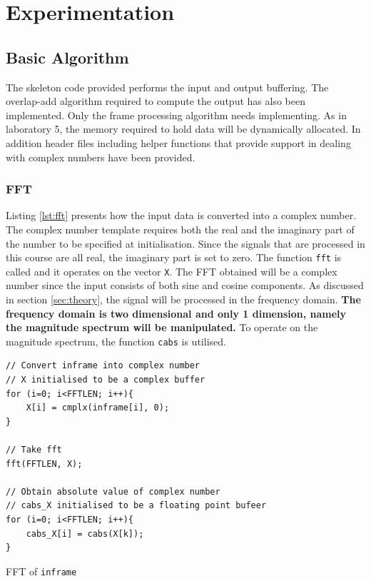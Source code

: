 \documentclass[a4paper,pra,twocolumn,10pt,aps,longbibliography,nobalancelastpage]{revtex4-1}
\begin{document}
\section{Experimentation}
\subsection{Basic Algorithm}
The skeleton code provided performs the input and output buffering. The overlap-add algorithm required to compute the output has also been implemented. Only the frame processing algorithm needs implementing. As in laboratory 5, the memory required to hold data will be dynamically allocated. In addition header files including helper functions that provide support in dealing with complex numbers have been provided.

\subsubsection{FFT}
Listing \ref{lst:fft} presents how the input data is converted into a complex number. The complex number template requires both the real and the imaginary part of the number to be specified at initialisation. Since the signals that are processed in this course are all real, the imaginary part is set to zero. The function {\tt fft} is called and it operates on the vector {\tt X}. The FFT obtained will be a complex number since the input consists of both sine and cosine components. As discussed in section \ref{sec:theory}, the signal will be processed in the frequency domain. \textbf{The frequency domain is two dimensional and only 1 dimension, namely the magnitude spectrum will be manipulated.} To operate on the magnitude spectrum, the function {\tt cabs} is utilised.

\begin{listing}[H]
\begin{verbatim}
// Convert inframe into complex number
// X initialised to be a complex buffer
for (i=0; i<FFTLEN; i++){                           
    X[i] = cmplx(inframe[i], 0);
} 

// Take fft
fft(FFTLEN, X);

// Obtain absolute value of complex number
// cabs_X initialised to be a floating point bufeer
for (i=0; i<FFTLEN; i++){                           
    cabs_X[i] = cabs(X[k]);
} 
\end{verbatim}
\caption{FFT of {\tt inframe}} 
\label{lst:fft}
\end{listing}
\end{document}

